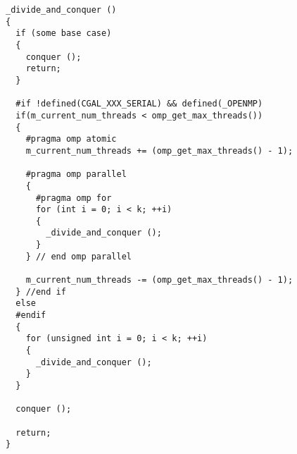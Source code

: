 \begin{verbatim}
_divide_and_conquer ()
{
  if (some base case)
  {
    conquer ();
    return;
  }

  #if !defined(CGAL_XXX_SERIAL) && defined(_OPENMP)
  if(m_current_num_threads < omp_get_max_threads())
  {
    #pragma omp atomic
    m_current_num_threads += (omp_get_max_threads() - 1);
       
    #pragma omp parallel
    {
      #pragma omp for
      for (int i = 0; i < k; ++i)
      {
        _divide_and_conquer ();
      }         
    } // end omp parallel
        
    m_current_num_threads -= (omp_get_max_threads() - 1);
  } //end if
  else    
  #endif
  {        
    for (unsigned int i = 0; i < k; ++i)
    {
      _divide_and_conquer ();
    }
  }
    
  conquer ();
    
  return;
}
\end{verbatim}

